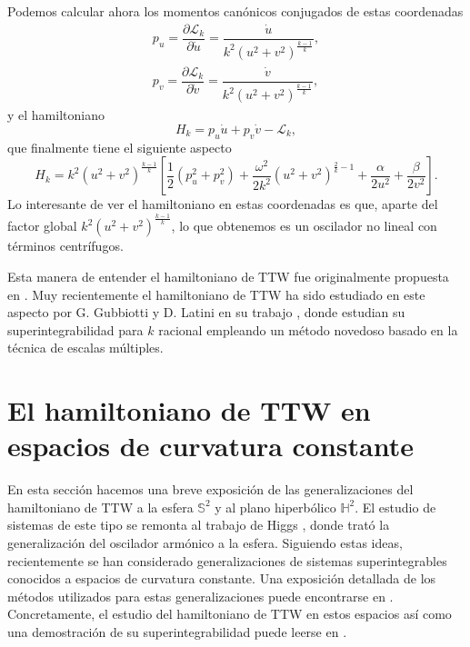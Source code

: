 \documentclass[11pt,a4paper,twoside]{article}
\theoremstyle{definition} \newtheorem{defn}[thm]{Definición}
\theoremstyle{definition} \newtheorem{ejemplo}[thm]{Ejemplo}
\theoremstyle{definition} \newtheorem{ejercicio}[thm]{Ejercicio}
\theoremstyle{remark} \newtheorem*{obs}{Observación}
\begin{document}
Podemos calcular ahora los momentos canónicos conjugados de estas coordenadas
\begin{align}
    p_u=\dfrac{\partial \mathcal{L} _k}{\partial \dot{u}}=\dfrac{\dot{u}}{k^2 (u^2+v^2)^{\frac{k-1}{k}}}, \\
    p_v=\dfrac{\partial \mathcal{L} _k}{\partial \dot{v}}=\dfrac{\dot{v}}{k^2 (u^2+v^2)^{\frac{k-1}{k}}},
\end{align}
y el hamiltoniano
\begin{equation*}
  H_k=p_u \dot{u} + p_v \dot{v} - \mathcal{L}_k,
\end{equation*}
que finalmente tiene el siguiente aspecto
\begin{equation}\label{nuevottw}
  H_k = k^2 (u^2+v^2)^{\frac{k-1}{k}}\left[ \frac{1}{2}(p_u^2+p_v^2)+ \frac{\omega^2}{2k^2}(u^2+v^2)^{\frac{2}{k}-1}+\frac{\alpha}{2u^2}+\frac{\beta}{2 v^2} \right]. 
\end{equation}
Lo interesante de ver el hamiltoniano en estas coordenadas es que, aparte del factor global $k^2(u^2+v^2)^{\frac{k-1}{k}}$, lo que obtenemos es un oscilador no lineal con términos centrífugos.

Esta manera de entender el hamiltoniano de TTW fue originalmente propuesta en \cite{burgos}. Muy recientemente el hamiltoniano de TTW ha sido estudiado en este aspecto por G. Gubbiotti y D. Latini en su trabajo \cite{gubbiottilatini}, donde estudian su superintegrabilidad para $k$ racional empleando un método novedoso basado en la técnica de escalas múltiples.

\section{El hamiltoniano de TTW en espacios de curvatura constante}\label{curvo}
En esta sección hacemos una breve exposición de las generalizaciones del hamiltoniano de TTW a la esfera $\mathbb{S} ^2$ y al plano hiperbólico $\mathbb{H} ^2.$ El estudio de sistemas de este tipo se remonta al trabajo de Higgs \cite{higgs}, donde trató la generalización del oscilador armónico a la esfera. Siguiendo estas ideas, recientemente se han considerado generalizaciones de sistemas superintegrables conocidos a espacios de curvatura constante. Una exposición detallada de los métodos utilizados para estas generalizaciones puede encontrarse en \cite{ballesteros}. Concretamente, el estudio del hamiltoniano de TTW en estos espacios así como una demostración de su superintegrabilidad puede leerse en \cite{ranada}.
\end{document}
